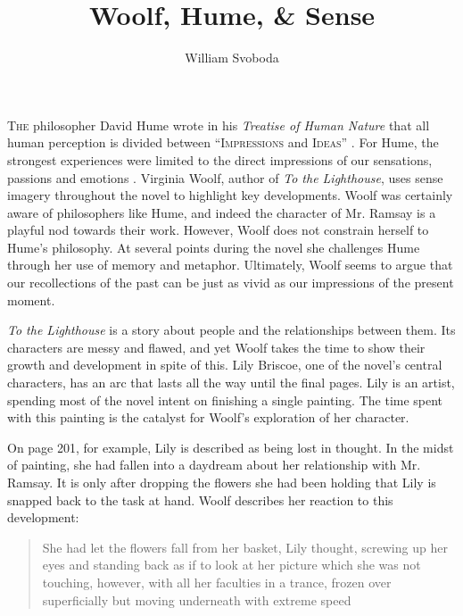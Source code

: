 %
%



\titlehead{Princeton University}
\title{Woolf, Hume, \& Sense}
\author{William Svoboda}
\subject{Ways of Knowing: Philosophy and Literature}
\date{}

%
%



\maketitle

\lettrine[nindent=0pt, findent=0.25em, loversize=0.09]{T}{he} philosopher David Hume wrote in his \emph{Treatise of Human Nature} that all human perception is divided between \enquote{\textsc{Impressions} and \textsc{Ideas}} \autocite[1]{hume_78}. For Hume, the strongest experiences were limited to the direct impressions of our sensations, passions and emotions \autocite[1]{hume_78}. Virginia Woolf, author of \emph{To the Lighthouse}, uses sense imagery throughout the novel to highlight key developments. Woolf was certainly aware of philosophers like Hume, and indeed the character of Mr. Ramsay is a playful nod towards their work. However, Woolf does not constrain herself to Hume's philosophy. At several points during the novel she challenges Hume through her use of memory and metaphor. Ultimately, Woolf seems to argue that our recollections of the past can be just as vivid as our impressions of the present moment.

\emph{To the Lighthouse} is a story about people and the relationships between them. Its characters are messy and flawed, and yet Woolf takes the time to show their growth and development in spite of this. Lily Briscoe, one of the novel's central characters, has an arc that lasts all the way until the final pages. Lily is an artist, spending most of the novel intent on finishing a single painting. The time spent with this painting is the catalyst for Woolf's exploration of her character.

On page 201, for example, Lily is described as being lost in thought. In the midst of painting, she had fallen into a daydream about her relationship with Mr. Ramsay. It is only after dropping the flowers she had been holding that Lily is snapped back to the task at hand. Woolf describes her reaction to this development:

\blockcquote[][201]{woolf_81}[.]{She had let the flowers fall from her basket, Lily thought, screwing up her eyes and standing back as if to look at her picture which she was not touching, however, with all her faculties in a trance, frozen over superficially but moving underneath with extreme speed}


